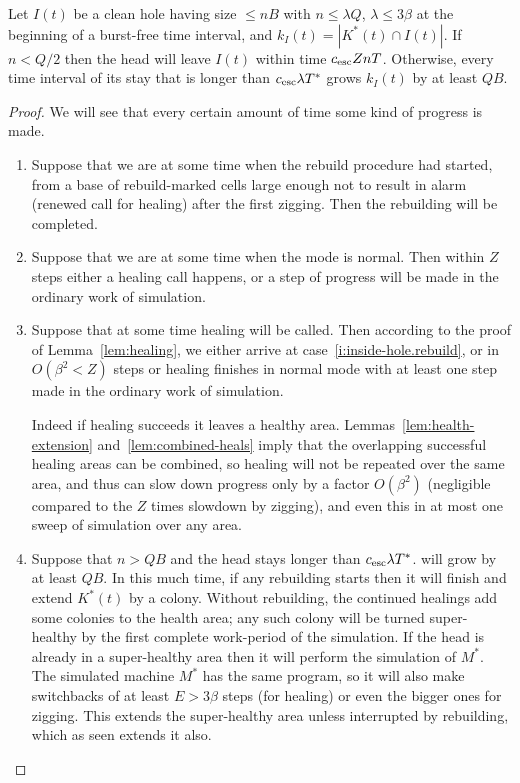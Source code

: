 \documentclass[11pt]{memoir}
\theoremstyle{definition} %
\renewcommand{\le}{\leq}
\def\B{B}
\newcommand{\E}{E}
\newcommand{\Q}{Q}
\newcommand{\Tu}{T}
\newcommand{\Tus}{T^{*}}
\newcommand{\Z}{Z}
\newcommand{\cns}[1]{c_{\textrm{\upshape #1}}}
\newcommand{\CEsc}{\cns{esc}}
\begin{document}
\begin{lemma}\label{lem:inside-hole}
  Let \( I(t) \) be a clean hole having size \( \le n\B \) with \( n\le\lambda\Q \), \( \lambda\le 3\beta \) at the
  beginning of a burst-free time interval,
  and \( k_{I}(t)=|K^{*}(t)\cap I(t)| \).
  If \( n<\Q/2 \) then the head will leave \( I(t) \) within time \( \CEsc\Z n\Tu \).
  Otherwise, every time interval of its stay that is longer than \( \CEsc\lambda\Tus \) grows
  \( k_{I}(t) \) by at least \( \Q\B \).
\end{lemma}
\begin{proof}
  We will see that every certain amount of time some kind of progress is made.
  \begin{enumerate}
  \item\label{i:inside-hole.rebuild}
Suppose that we are at some time when the rebuild procedure had started,
from a base of rebuild-marked cells large enough not to result in alarm (renewed call for healing)
after the first zigging.
Then the rebuilding will be completed.

\item\label{i:inside-hole.normal}
  Suppose that we are at some time when the mode is normal.
  Then within \( \Z \) steps either a healing call happens, or a step of progress will be
  made in the ordinary work of simulation.
\item\label{i:inside-hole.alarm}
  Suppose that at some time healing will be called.
  Then according to the proof of Lemma~\ref{lem:healing},
  we either arrive at case~\ref{i:inside-hole.rebuild},
  or  in \( O(\beta^{2}<\Z) \) steps or healing finishes in
  normal mode with at least one step made in the ordinary work of simulation.
  
  Indeed if healing succeeds it leaves a healthy area.
  Lemmas~\ref{lem:health-extension} and~\ref{lem:combined-heals} imply that 
  the overlapping successful healing areas can be combined, so healing will not be repeated over the same
  area, and thus can slow down progress only by a 
  factor \( O(\beta^{2}) \) (negligible compared to the \( \Z \) times slowdown by zigging), and even this
  in at most one sweep of simulation over any area.

\item\label{i:long-stay}  Suppose that \( n>\Q\B \) and the head stays longer than \( \CEsc\lambda\Tus \).
  will grow by at least \( \Q\B \).
  In this much time, if any rebuilding starts then it will finish and extend \( K^{*}(t) \) by a colony.
  Without rebuilding, the continued healings add some colonies to the health area; any such colony will be
  turned super-healthy by the first complete work-period of the simulation.
  If the head is already in a super-healthy area then it will perform the simulation of \( M^{*} \).
  The simulated machine \( M^{*} \) has the same program, so it will also make switchbacks
  of at least \( \E>3\beta \) steps (for healing) or even the bigger ones for zigging.
  This extends the super-healthy area unless interrupted by rebuilding, which as seen extends it also.
\end{enumerate}
\end{proof}
\end{document}
